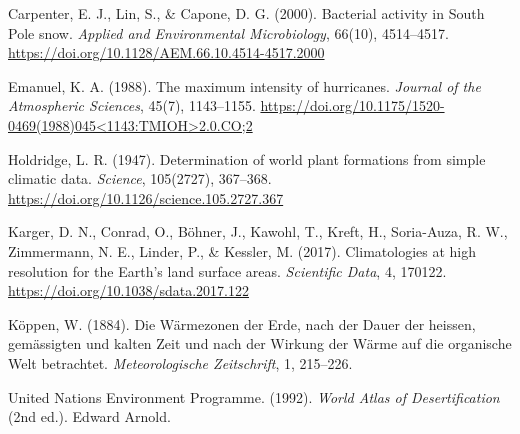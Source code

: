 \documentclass[12pt]{article}
\begin{document}
Carpenter, E. J., Lin, S., \& Capone, D. G. (2000).
Bacterial activity in South Pole snow.
\textit{Applied and Environmental Microbiology}, 66(10), 4514--4517.
\url{https://doi.org/10.1128/AEM.66.10.4514-4517.2000}

Emanuel, K. A. (1988).
The maximum intensity of hurricanes.
\textit{Journal of the Atmospheric Sciences}, 45(7), 1143--1155.
\url{https://doi.org/10.1175/1520-0469(1988)045<1143:TMIOH>2.0.CO;2}

Holdridge, L. R. (1947).
Determination of world plant formations from simple climatic data.
\textit{Science}, 105(2727), 367--368.
\url{https://doi.org/10.1126/science.105.2727.367}

Karger, D. N., Conrad, O., Böhner, J., Kawohl, T., Kreft, H., Soria-Auza, R. W.,
Zimmermann, N. E., Linder, P., \& Kessler, M. (2017).
Climatologies at high resolution for the Earth's land surface areas.
\textit{Scientific Data}, 4, 170122.
\url{https://doi.org/10.1038/sdata.2017.122}

Köppen, W. (1884).
Die Wärmezonen der Erde, nach der Dauer der heissen, gemässigten und kalten Zeit
und nach der Wirkung der Wärme auf die organische Welt betrachtet.
\textit{Meteorologische Zeitschrift}, 1, 215--226.

United Nations Environment Programme. (1992).
\textit{World Atlas of Desertification} (2nd ed.).
Edward Arnold.
\end{document}
